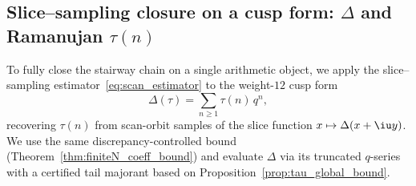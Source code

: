 \begin{table}[H]
\centering
{}
\caption{Slice--sampling recovery of the $E_6$ coefficient $a_1=-504$ at $y=1$ using a golden-branch scan orbit. The bound is the explicit instance of Theorem~\ref{thm:finiteN_coeff_bound} with the closed-form $\Var(g_{1,1})$ bound from Appendix~\ref{app:variation_bound_e6_explicit}. The truncation-bound column reports $\log_{10}$ of the truncation contribution to the recovered coefficient bound (Appendix~\ref{app:eisenstein_tail_bounds}). Reproducible via Experiment~IX in Appendix~\ref{app:repro_code}.}
\label{tab:e6_slice_sampling_bound}
\end{table}

\subsection{Slice--sampling closure on a cusp form: \texorpdfstring{$\Delta$}{Delta} and Ramanujan \texorpdfstring{$\tau(n)$}{tau(n)}}
\label{app:quant_fits_slice_sampling_delta}

To fully close the stairway chain on a single arithmetic object, we apply the slice--sampling estimator~\eqref{eq:scan_estimator} to the weight-$12$ cusp form
\begin{equation}
\Delta(\tau)=\sum_{n\ge 1}\tau(n)\,q^n,
\end{equation}
recovering $\tau(n)$ from scan-orbit samples of the slice function $x\mapsto \Delta(x+\iu y)$.
We use the same discrepancy-controlled bound (Theorem~\ref{thm:finiteN_coeff_bound}) and evaluate $\Delta$ via its truncated $q$-series with a certified tail majorant based on Proposition~\ref{prop:tau_global_bound}.

